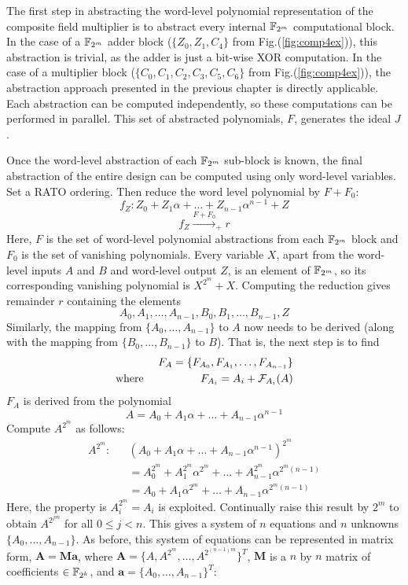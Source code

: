 The first step in abstracting the word-level polynomial representation of the composite field
multiplier is to abstract every internal ${\mathbb{F}}_{2^m}$ computational block. In the case of a ${\mathbb{F}}_{2^m}$
adder block ($\{Z_0,Z_1,C_4\}$ from Fig.(\ref{fig:comp4ex})), this abstraction is trivial, as the adder is just a bit-wise XOR computation. In the case
of a multiplier block ($\{C_0,C_1,C_2,C_3,C_5,C_6\}$ from Fig.(\ref{fig:comp4ex})), 
the abstraction approach presented in the previous chapter is directly 
applicable. Each abstraction can be computed independently, so these computations can be 
performed in parallel. This set of abstracted polynomials, $F$, generates the ideal $J$.

Once the word-level abstraction of each ${\mathbb{F}}_{2^m}$ sub-block is known, the final abstraction of the 
entire design can be computed using only word-level variables. Set a RATO ordering. Then
reduce the word level polynomial by $F+F_0$:
\begin{equation}
f_Z: Z_0+Z_1\alpha+\dots+Z_{n-1}\alpha^{n-1}+Z
\end{equation}
\begin{equation}
f_Z\xrightarrow{F+F_0}_+ r
\end{equation}
Here, $F$ is the set of word-level
polynomial abstractions from each ${\mathbb{F}}_{2^m}$ block and $F_0$ is the set of vanishing polynomials.
Every variable $X$, apart from the word-level inputs $A$ and $B$ and word-level output $Z$, is an element of
${\mathbb{F}}_{2^m}$, so its corresponding vanishing polynomial is $X^{2^m}+X$. Computing the reduction
gives remainder $r$ containing the elements 
\begin{equation}
A_0,A_1,\dots,A_{n-1},B_0,B_1,\dots,B_{n-1},Z
\end{equation}
Similarly, the mapping from $\{A_0,\dots,A_{n-1}\}$ to $A$ now needs to be derived (along with
the mapping from $\{B_0,\dots,B_{n-1}\}$ to $B$). That is, the next step is to find 
\begin{eqnarray}
& &F_A=\{F_{A_0},F_{A_1},\dots,F_{A_{n-1}}\} \nonumber \\
\text{where }& &F_{A_i}=A_i+{\mathcal{F}}_{A_i}(A)
\end{eqnarray}
$F_A$ is derived from the polynomial
\begin{equation}
A=A_0+A_1\alpha+\dots+A_{n-1}\alpha^{n-1}
\end{equation}
Compute $A^{2^m}$ as follows:
\begin{eqnarray}
A^{2^m}: & & (A_0+A_1\alpha+\dots+A_{n-1}\alpha^{n-1})^{2^m} \nonumber \\
&&=A_0^{2^m}+A_1^{2^m}\alpha^{2^m}+\dots+A_{n-1}^{2^m}\alpha^{2^m(n-1)} \nonumber \\
&&=A_0+A_1\alpha^{2^m}+\dots+A_{n-1}\alpha^{2^m(n-1)}
\end{eqnarray}
Here, the property is $A_i^{2^m}=A_i$ is exploited. Continually raise this result by $2^m$ 
to obtain $A^{2^{jm}}$ for all $0\leq j < n$. This gives a system of $n$ equations and $n$
unknowns $\{A_0,\dots,A_{n-1}\}$. As before, this system of equations can be represented
in matrix form, $\mathbf{A = M a}$, where 
$\mathbf{A}=\{A,A^{2^m},\dots,A^{2^{(n-1)m}}\}^T$, 
$\mathbf{M}$ is
a $n$ by $n$ matrix of coefficients $\in {\mathbb{F}}_{2^k}$, and $\mathbf{a}=\{A_0,\dots,A_{n-1}\}^T$:

